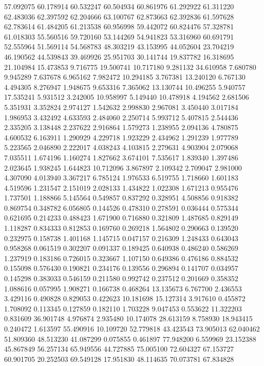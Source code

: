 57.092075
60.178914
60.532247
60.504934
60.861976
61.292922
61.311220
62.483036
62.397592
62.204666
63.100767
62.873663
62.392836
61.597628
62.783614
61.484205
61.213538
60.956998
59.442072
60.824476
57.328781
61.018303
55.560516
59.720160
53.144269
54.941823
53.316960
60.691791
52.555964
51.569114
54.568783
48.303219
43.153995
44.052604
23.704219
46.190562
44.539843
39.469926
25.951703
30.141744
19.837782
16.318695
21.104984
15.473853
9.716775
19.500741
10.717180
9.281132
34.610958
7.680780
9.945289
7.637678
6.965162
7.982472
10.294185
3.767381
13.240120
6.767130
4.494305
8.276947
1.948675
9.653316
7.365062
13.130744
10.496255
5.940757
17.535241
5.931512
3.242005
10.958997
5.149440
10.478918
4.194562
2.681506
5.351931
3.352824
2.974127
1.542632
2.998830
2.967081
3.450440
3.017184
1.986953
3.432492
4.633593
2.484060
2.250714
5.993712
5.407815
2.544436
2.335205
3.138448
2.237622
2.916864
1.579273
1.238955
2.094136
4.780875
4.600532
6.163911
1.290929
4.229718
1.923229
2.434962
1.291239
1.977789
5.223565
2.046890
2.222017
4.038243
4.103815
2.279631
4.903904
2.079068
7.035511
1.674196
1.160274
1.827662
3.674101
7.535617
1.839340
1.397486
2.023645
1.938245
1.644823
10.712096
3.867897
2.109342
2.709047
2.981000
4.307090
4.013940
3.367217
6.785124
1.976533
6.519755
1.718660
1.601183
4.519596
1.231547
2.151019
2.028133
1.434822
1.022308
1.671213
0.955476
1.737501
1.188866
5.145564
0.549857
0.837292
0.328951
4.508856
0.918382
0.869754
0.348782
6.056805
0.144526
0.478310
0.278591
0.036444
0.575344
0.621695
0.214233
0.488423
1.671900
0.716880
0.321809
1.487685
0.829149
1.118287
0.834333
0.812853
0.169760
0.269218
1.564802
0.290663
0.139520
0.232975
0.158738
1.401168
1.145715
0.047157
0.216309
1.248433
0.643043
0.958268
0.061519
0.302207
0.091337
0.189425
0.640938
0.486240
0.586269
1.237919
0.183186
0.726015
0.323667
1.107150
0.649386
0.476186
0.884532
0.155098
0.576430
0.190821
0.234176
0.139556
0.296894
0.141707
0.034957
0.145298
0.383033
0.546159
0.211580
0.992742
0.237512
0.201669
0.358352
1.088616
0.057995
1.908271
0.166738
0.468264
13.135673
6.767700
2.436553
3.429116
0.490828
0.829053
0.422623
10.181698
15.127314
3.917610
0.455872
1.708092
0.113345
0.127859
0.182110
1.703228
9.047453
0.553622
11.322203
0.831609
36.901748
4.976874
2.935480
10.174078
28.613159
8.758930
18.943415
0.240472
1.613597
55.490916
10.109720
52.779818
43.423543
73.905013
62.040462
51.809360
48.513230
41.087299
0.075855
0.461897
77.948200
6.559969
23.152388
45.867849
56.257134
65.949556
44.727885
75.005100
72.604327
67.153727
60.901705
20.252503
69.549128
17.951830
48.114635
70.073781
67.834828
